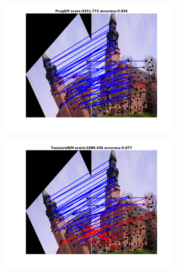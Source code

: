 \documentclass[
	fontsize=12pt,
	paper=a4,
	twoside=false,
	numbers=noenddot,
	plainheadsepline,
	toc=listof,
	toc=bibliography
]{scrartcl}
\begin{document}
\begin{figure}[h]
	\begin{subfigure}[b]{0.33\textwidth}
		\centering
		\includegraphics[scale=0.25]{"fig_ver2608/RealImages/ImgTrafo/anchor_descr/using_cpd_afftrafo/fi_5_ProgGM"} 
	\end{subfigure}%
	\begin{subfigure}[b]{0.33\textwidth}
		\centering
		\includegraphics[scale=0.25]{"fig_ver2608/RealImages/ImgTrafo/anchor_descr/using_cpd_afftrafo/fi_5_TwoLevelGM"} 
	\end{subfigure} 
	\begin{subfigure}[b]{0.33\textwidth}
		\centering

\end{subfigure}
\end{figure}
\end{document}
